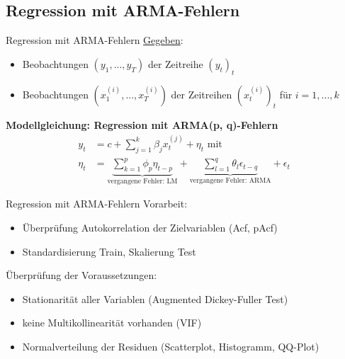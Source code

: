 \subsection{Regression mit ARMA-Fehlern}
\begin{frame}{Regression mit ARMA-Fehlern}
	\underline{Gegeben}: 
	\begin{itemize}
		\item Beobachtungen $(y_1,...,y_T)$ der Zeitreihe $(y_t)_t$
		\item Beobachtungen $(x_1^{(i)},...,x_T^{(i)})$ der Zeitreihen $(x_t^{(i)})_t$ für $i=1,...,k$
	\end{itemize}
	\textbf{Modellgleichung: Regression mit ARMA(p, q)-Fehlern} \cite{forecasting}\\
	\begin{align*}
		y_t &= c + \sum_{j=1}^{k}\beta_j x_t^{(j)} + \eta_t \text{ mit} \\
		\eta_t &= \underbrace{\sum_{k=1}^{p}\phi_p\eta_{t-p}}_{\text{vergangene Fehler: LM}} + \underbrace{\sum_{l=1}^{q}\theta_l\epsilon_{t-q}}_{\text{vergangene Fehler: ARMA}} + \epsilon_{t}
	\end{align*}
\end{frame}

\begin{frame}{Regression mit ARMA-Fehlern}
	Vorarbeit:
	\begin{itemize}
		\item Überprüfung Autokorrelation der Zielvariablen (Acf, pAcf)
		\item Standardisierung Train, Skalierung Test
	\end{itemize}
	Überprüfung der Voraussetzungen:
	\begin{itemize}
		\item Stationarität aller Variablen (Augmented Dickey-Fuller Test)
		\item keine Multikollinearität vorhanden (VIF)
		\item Normalverteilung der Residuen (Scatterplot, Histogramm, QQ-Plot)
	\end{itemize}
\end{frame}

